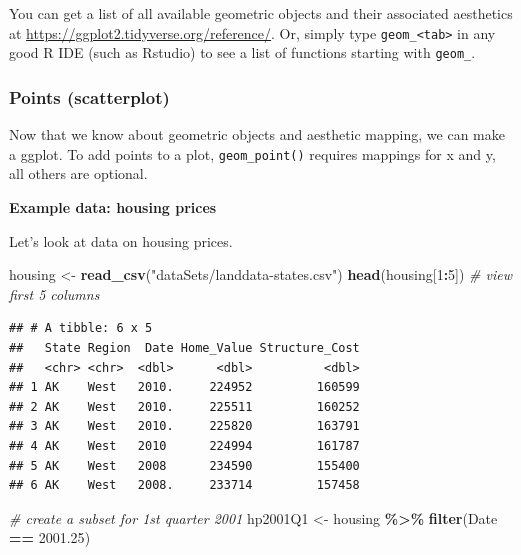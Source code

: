 \documentclass[
]{book}
\newenvironment{Shaded}{\begin{snugshade}}{\end{snugshade}}
\newcommand{\CommentTok}[1]{\textcolor[rgb]{0.56,0.35,0.01}{\textit{#1}}}
\newcommand{\DecValTok}[1]{\textcolor[rgb]{0.00,0.00,0.81}{#1}}
\newcommand{\FloatTok}[1]{\textcolor[rgb]{0.00,0.00,0.81}{#1}}
\newcommand{\KeywordTok}[1]{\textcolor[rgb]{0.13,0.29,0.53}{\textbf{#1}}}
\newcommand{\NormalTok}[1]{#1}
\newcommand{\OperatorTok}[1]{\textcolor[rgb]{0.81,0.36,0.00}{\textbf{#1}}}
\newcommand{\StringTok}[1]{\textcolor[rgb]{0.31,0.60,0.02}{#1}}
\begin{document}
You can get a list of all available geometric objects and their associated aesthetics at \url{https://ggplot2.tidyverse.org/reference/}. Or, simply type \texttt{geom\_\textless{}tab\textgreater{}} in any good R IDE (such as Rstudio) to see a list of functions starting with \texttt{geom\_}.

\hypertarget{points-scatterplot}{%
\subsubsection{Points (scatterplot)}\label{points-scatterplot}}

Now that we know about geometric objects and aesthetic mapping, we can make a ggplot. To add points to a plot, \texttt{geom\_point()} requires mappings for x and y, all others are optional.

\textbf{Example data: housing prices}

Let's look at data on housing prices.

\begin{Shaded}
\begin{Highlighting}[]
\NormalTok{housing \textless{}{-}}\StringTok{ }\KeywordTok{read\_csv}\NormalTok{(}\StringTok{"dataSets/landdata{-}states.csv"}\NormalTok{)}
\KeywordTok{head}\NormalTok{(housing[}\DecValTok{1}\OperatorTok{:}\DecValTok{5}\NormalTok{]) }\CommentTok{\# view first 5 columns}
\end{Highlighting}
\end{Shaded}

\begin{verbatim}
## # A tibble: 6 x 5
##   State Region  Date Home_Value Structure_Cost
##   <chr> <chr>  <dbl>      <dbl>          <dbl>
## 1 AK    West   2010.     224952         160599
## 2 AK    West   2010.     225511         160252
## 3 AK    West   2010.     225820         163791
## 4 AK    West   2010      224994         161787
## 5 AK    West   2008      234590         155400
## 6 AK    West   2008.     233714         157458
\end{verbatim}

\begin{Shaded}
\begin{Highlighting}[]
\CommentTok{\# create a subset for 1st quarter 2001}
\NormalTok{hp2001Q1 \textless{}{-}}\StringTok{ }\NormalTok{housing }\OperatorTok{\%\textgreater{}\%}\StringTok{ }\KeywordTok{filter}\NormalTok{(Date }\OperatorTok{==}\StringTok{ }\FloatTok{2001.25}\NormalTok{)}
\end{Highlighting}
\end{Shaded}
\end{document}
